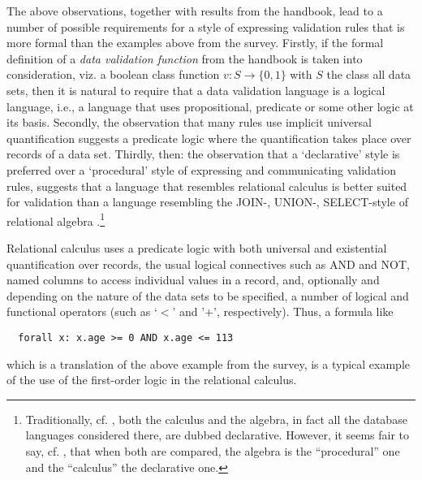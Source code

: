 The above observations, together with results from the handbook, lead to a number of possible requirements for a style of expressing validation rules that is more formal than the examples above from the survey. Firstly, if the formal definition of a {\em data validation function} from the handbook is taken into consideration, viz. a boolean class function $v:S\to\{0,1\}$ with $S$ the class all data sets, then it is natural to require that a data validation language is a logical language, i.e., a language that uses propositional, predicate or some other logic at its basis. Secondly, the observation that many rules use implicit universal quantification suggests a predicate logic where the quantification takes place over records of a data set. Thirdly, then: the observation that a `declarative' style is preferred over a `procedural' style of expressing and communicating validation rules, suggests that a language that resembles relational calculus \cite{abiteboul} is better suited for validation than a language resembling the JOIN-, UNION-, SELECT-style of relational algebra \cite{abiteboul}.\footnote{Traditionally, cf. \cite{abiteboul}, both the calculus and the algebra, in fact all the database languages considered there, are dubbed declarative. However, it seems fair to say, cf. \cite{dude}, that when both are compared, the algebra is the ``procedural'' one and the ``calculus'' the declarative one.}

Relational calculus uses a predicate logic with both universal and existential quantification over records, the usual logical connectives such as AND and NOT, named columns to access individual values in a record, and, optionally and depending on the nature of the data sets to be specified, a number of logical and functional operators (such as `$<$' and '$+$', respectively). Thus, a formula like
\begin{verbatim}
  forall x: x.age >= 0 AND x.age <= 113
\end{verbatim}
which is a translation of the above example from the survey, is a typical example of the use of the first-order logic in the relational calculus.

